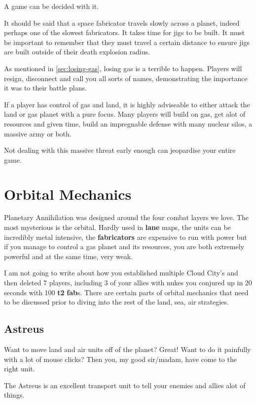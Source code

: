 \documentclass[]{article}
\begin{document}
A game can be decided with it.  

It should be said that a space fabricator travels slowly across a planet, indeed perhaps one of the slowest fabricators.  It takes time for jigs to be built.  It must be important to remember that they must travel a certain distance to ensure jigs are built outside of their death explosion radius.

As mentioned in \ref{sec:losing-gas}, losing gas is a terrible to happen.  Players will resign, disconnect and call you all sorts of names, demonstrating the importance it was to their battle plans.  

If a player has  control of gas and land, it is highly adviseable to either attack the land or gas planet with a pure focus.  Many players will build on gas, get alot of resources and given time, build an impregnable defense with many nuclear silos, a massive army or both.  

Not dealing with this massive threat early enough can jeopardise your entire game.  

\newpage
\section{Orbital Mechanics}

Planetary Annihilation was designed around the four combat layers we love.  The most mysterious is the orbital.  Hardly used in \textbf{lane} maps, the units can be incredibly metal intensive, the \textbf{fabricators} are expensive to run with power but if you manage to control a gas planet and its resources, you are both extremely powerful and at the same time, very weak.  

I am not going to write about how you established multiple Cloud City's and then deleted 7 players, including 3 of your allies with nukes you conjured up in 20 seconds with 100 \textbf{t2} \textbf{fab}s.  There are certain parts of orbital mechanics that need to be discussed prior to diving into the rest of the land, sea, air strategies.  

\subsection{Astreus}

Want to move land and air units off of the planet?  Great!  Want to do it painfully with a lot of mouse clicks?  Then you, my good sir/madam, have come to the right unit. 

The Astreus is an excellent transport unit to tell your enemies and allies alot of things.  
\end{document}
